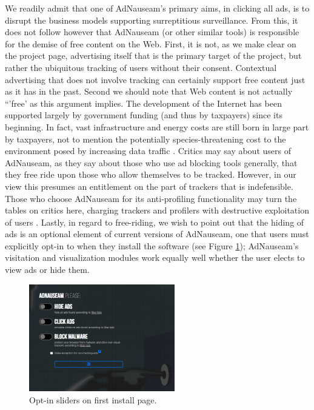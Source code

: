 \documentclass[conference]{IEEEtran}
\begin{document}
We readily admit that one of AdNauseam's primary aims, in clicking all ads, is to disrupt the business models supporting surreptitious surveillance. From this, it does not follow however that AdNauseam (or other similar tools) is responsible for the demise of free content on the Web. First, it is not, as we make clear on the project page, advertising itself that is the primary target of the project, but rather the ubiquitous tracking of users without their consent. Contextual advertising that does not involve tracking can certainly support free content just as it has in the past. Second we should note that Web content is not actually “'free' as this argument implies. The development of the Internet has been supported largely by government funding (and thus by taxpayers) since its beginning. In fact, vast infrastructure and energy costs are still born in large part by taxpayers, not to mention the potentially species-threatening cost to the environment posed by increasing data traffic \cite{Hazas}. Critics may say about users of AdNauseam, as they say about those who use ad blocking tools generally, that they free ride upon those who allow themselves to be tracked. However, in our view this presumes an entitlement on the part of trackers that is indefensible. Those who choose AdNauseam for its anti-profiling functionality may turn the tables on critics here, charging  trackers and profilers with destructive exploitation of users \cite{Brunton}. Lastly, in regard to free-riding, we wish to point out that the hiding of ads is an optional element of current versions of AdNauseam, one that users must explicitly opt-in to when they install the software (see Figure \ref{fig:firstrun}); AdNauseam's visitation and visualization modules work equally well whether the user elects to view ads or hide them.

\begin{figure}[!t]
\centering
\includegraphics[width=2.5in]{images/firstrun.png}
\caption{Opt-in sliders on first install page.}
\label{fig:firstrun}
\end{figure}
\end{document}
